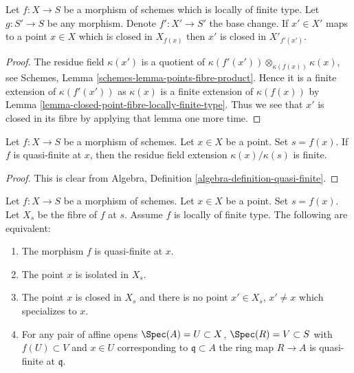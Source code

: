 \begin{lemma}
\label{lemma-base-change-closed-point-fibre-locally-finite-type}
Let $f : X \to S$ be a morphism of schemes which is locally of finite type.
Let $g : S' \to S$ be any morphism. Denote $f' : X' \to S'$ the base change.
If $x' \in X'$ maps to a point $x \in X$ which is closed in $X_{f(x)}$
then $x'$ is closed in $X'_{f'(x')}$.
\end{lemma}

\begin{proof}
The residue field $\kappa(x')$ is a quotient of
$\kappa(f'(x')) \otimes_{\kappa(f(x))} \kappa(x)$, see
Schemes, Lemma \ref{schemes-lemma-points-fibre-product}.
Hence it is a finite extension of $\kappa(f'(x'))$ as
$\kappa(x)$ is a finite extension of $\kappa(f(x))$ by
Lemma \ref{lemma-closed-point-fibre-locally-finite-type}.
Thus we see that $x'$ is closed in its fibre by applying that lemma
one more time.
\end{proof}

\begin{lemma}
\label{lemma-residue-field-quasi-finite}
Let $f : X \to S$ be a morphism of schemes.
Let $x \in X$ be a point. Set $s = f(x)$.
If $f$ is quasi-finite at $x$, then the residue field
extension $\kappa(x)/\kappa(s)$ is finite.
\end{lemma}

\begin{proof}
This is clear from Algebra, Definition \ref{algebra-definition-quasi-finite}.
\end{proof}

\begin{lemma}
\label{lemma-quasi-finite-at-point-characterize}
Let $f : X \to S$ be a morphism of schemes.
Let $x \in X$ be a point. Set $s = f(x)$.
Let $X_s$ be the fibre of $f$ at $s$.
Assume $f$ is locally of finite type.
The following are equivalent:
\begin{enumerate}
\item The morphism $f$ is quasi-finite at $x$.
\item The point $x$ is isolated in $X_s$.
\item The point $x$ is closed in $X_s$
and there is no point $x' \in X_s$, $x' \not = x$
which specializes to $x$.
\item For any pair of affine opens
$\Spec(A) = U \subset X$, $\Spec(R) = V \subset S$ with
$f(U) \subset V$ and $x \in U$ corresponding to $\mathfrak q \subset A$
the ring map $R \to A$ is quasi-finite at $\mathfrak q$.
\end{enumerate}
\end{lemma}

